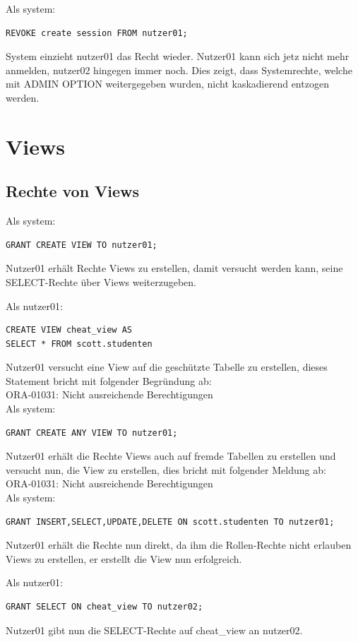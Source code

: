 \documentclass[10pt]{scrreprt}
\begin{document}
Als system:
\begin{lstlisting}[style=sql]
REVOKE create session FROM nutzer01;
\end{lstlisting}
System einzieht nutzer01 das Recht wieder. Nutzer01 kann sich jetz nicht mehr anmelden, nutzer02 hingegen immer noch. Dies zeigt, dass Systemrechte, welche mit ADMIN OPTION weitergegeben wurden, nicht kaskadierend entzogen werden.

\section{Views}
\subsection{Rechte von Views}
Als system:
\begin{lstlisting}[style=sql]
GRANT CREATE VIEW TO nutzer01;
\end{lstlisting}
Nutzer01 erhält Rechte Views zu erstellen, damit versucht werden kann, seine SELECT-Rechte über Views weiterzugeben.

Als nutzer01:
\begin{lstlisting}[style=sql]
CREATE VIEW cheat_view AS
SELECT * FROM scott.studenten
\end{lstlisting}
Nutzer01 versucht eine View auf die geschützte Tabelle zu erstellen, dieses Statement bricht mit folgender Begründung ab:\\
ORA-01031: Nicht ausreichende Berechtigungen\\

Als system:
\begin{lstlisting}[style=sql]
GRANT CREATE ANY VIEW TO nutzer01;
\end{lstlisting}
Nutzer01 erhält die Rechte Views auch auf fremde Tabellen zu erstellen und versucht nun, die View zu erstellen, dies bricht mit folgender Meldung ab:\\
ORA-01031: Nicht ausreichende Berechtigungen\\

Als system:
\begin{lstlisting}[style=sql]
GRANT INSERT,SELECT,UPDATE,DELETE ON scott.studenten TO nutzer01;
\end{lstlisting}
Nutzer01 erhält die Rechte nun direkt, da ihm die Rollen-Rechte nicht erlauben Views zu erstellen, er erstellt die View nun erfolgreich.

Als nutzer01:
\begin{lstlisting}[style=sql]
GRANT SELECT ON cheat_view TO nutzer02;
\end{lstlisting}
Nutzer01 gibt nun die SELECT-Rechte auf cheat\_view an nutzer02.
\end{document}
